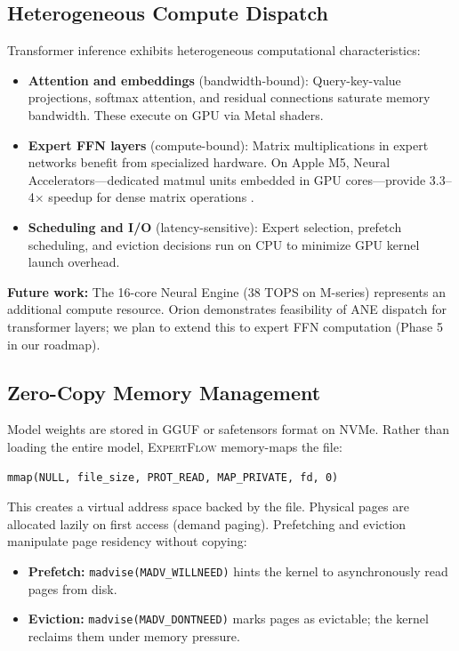 \documentclass[11pt]{article}
\begin{document}
\subsection{Heterogeneous Compute Dispatch}

Transformer inference exhibits heterogeneous computational characteristics:

\begin{itemize}
    \item \textbf{Attention and embeddings} (bandwidth-bound): Query-key-value projections, softmax attention, and residual connections saturate memory bandwidth. These execute on GPU via Metal shaders.

    \item \textbf{Expert FFN layers} (compute-bound): Matrix multiplications in expert networks benefit from specialized hardware. On Apple M5, Neural Accelerators—dedicated matmul units embedded in GPU cores—provide 3.3--4$\times$ speedup for dense matrix operations \cite{mlx2026}.

    \item \textbf{Scheduling and I/O} (latency-sensitive): Expert selection, prefetch scheduling, and eviction decisions run on CPU to minimize GPU kernel launch overhead.
\end{itemize}

\textbf{Future work:} The 16-core Neural Engine (38 TOPS on M-series) represents an additional compute resource. Orion \cite{orion2025} demonstrates feasibility of ANE dispatch for transformer layers; we plan to extend this to expert FFN computation (Phase 5 in our roadmap).

\subsection{Zero-Copy Memory Management}

Model weights are stored in GGUF or safetensors format on NVMe. Rather than loading the entire model, \textsc{ExpertFlow} memory-maps the file:
\begin{verbatim}
mmap(NULL, file_size, PROT_READ, MAP_PRIVATE, fd, 0)
\end{verbatim}

This creates a virtual address space backed by the file. Physical pages are allocated lazily on first access (demand paging). Prefetching and eviction manipulate page residency without copying:
\begin{itemize}
    \item \textbf{Prefetch:} \texttt{madvise(MADV\_WILLNEED)} hints the kernel to asynchronously read pages from disk.
    \item \textbf{Eviction:} \texttt{madvise(MADV\_DONTNEED)} marks pages as evictable; the kernel reclaims them under memory pressure.
\end{itemize}
\end{document}
